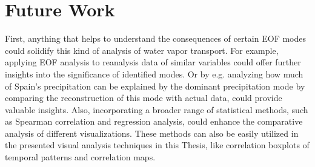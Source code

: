 \section{Future Work}
\label{sec:FutureWork}

%
%
%
First, anything that helps to understand the consequences of certain EOF modes could solidify this kind of analysis of water vapor transport. 
For example, applying EOF analysis to reanalysis data of similar variables could offer further insights into the significance of identified modes. 
Or by e.g. analyzing how much of Spain's precipitation can be explained by the dominant precipitation mode by comparing the reconstruction of this mode with actual data, could provide valuable insights.
Also, incorporating a broader range of statistical methods, such as Spearman correlation and regression analysis, could enhance the comparative analysis of different visualizations. 
These methods can also be easily utilized in the presented visual analysis techniques in this Thesis, like correlation boxplots of temporal patterns and correlation maps.
